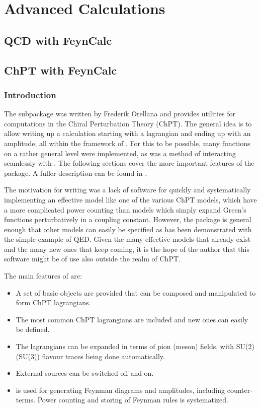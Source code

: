 \section{Advanced Calculations}

\subsection{QCD with FeynCalc}

\subsection{ChPT with FeynCalc}

\subsubsection{Introduction}

The subpackage \fphi was written by Frederik Orellana and provides utilities for computations in the Chiral Perturbation Theory (ChPT). The general idea is to allow writing up a calculation starting with a lagrangian and ending up with an amplitude, all within the framework of \fc. For this to be possible, many functions on a rather general level were implemented, as was a method of interacting seamlessly with \fa. The following sections cover the more important features of the package. A fuller description can be found in \cite{PHI}.

The motivation for writing \fphi was a lack of software for quickly and systematically implementing an effective model like one of the various ChPT models, which have a more complicated power counting than models which simply expand Green's functions perturbatively in a coupling constant. However, the package is general enough that other models can easily be specified as has been demonstrated with the simple example of QED. Given the many effective models that already exist and the many new ones that keep coming, it is the hope of the author that this software might be of use also outside the realm of ChPT.

The main features of \fphi are:
\begin{itemize}
\item A set of basic objects are provided that can be composed and manipulated to form ChPT lagrangians.
\item The most common ChPT lagrangians are included and new ones can easily be defined.
\item The lagrangians can be expanded in terms of pion (meson) fields, with SU(2) (SU(3)) flavour traces being done automatically.
\item External sources can be switched off and on.
\item \fa is used for generating Feynman diagrams and amplitudes, including counter-terms. Power counting and storing of Feynman rules is systematized.
\end{itemize}

